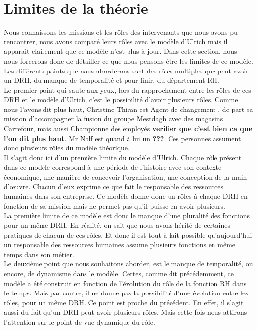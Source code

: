 \section{Limites de la théorie}

Nous connaissons les missions et les rôles des intervenants que nous avons pu rencontrer, nous avons comparé leurs rôles avec le modèle d'Ulrich mais il apparait clairement que ce modèle n'est plus à jour. Dans cette section, nous nous forcerons donc de détailler ce que nous pensons être les limites de ce modèle. Les différents points que nous aborderons sont des rôles multiples que peut avoir un DRH, du manque de temporalité et pour finir, du département RH. \\



Le premier point qui saute aux yeux, lors du rapprochement entre les rôles de ces DRH et le modèle d'Ulrich, c'est le possibilité d'avoir plusieurs rôles. Comme nous l'avons dit plus haut, Christine Thiran est \og Agent de changement \fg{}, de part sa mission d'accompagner la fusion du groupe Mestdagh avec des magasins Carrefour, mais aussi \og Championne des employés \fg{} \textbf{verifier que c'est bien ca que l'on dit plus haut}. Mr Nolf est quand à lui un \textbf{???}. Ces personnes assument donc plusieurs rôles du modèle théorique. \\

Il s'agit donc ici d'un première limite du modèle d'Ulrich. Chaque rôle présent dans ce modèle correspond à une période de l'histoire avec son contexte économique, une manière de concevoir l'organisation, une conception de la main d'œuvre. Chacun d'eux exprime ce que fait le responsable des ressources humaines dans son entreprise. Ce modèle donne donc un rôles à chaque DRH en fonction de sa mission mais ne permet pas qu'il puisse en avoir plusieurs. \\

La première limite de ce modèle est donc le manque d'une pluralité des fonctions pour un même DRH. En réalité, on sait que nous avons hérité de certaines pratiques de chacun de ces rôles. Et donc il est tout à fait possible qu'aujourd'hui un responsable des ressources humaines assume plusieurs fonctions en même temps dans son métier. \\



Le deuxième point que nous souhaitons aborder, est le manque de temporalité, ou encore, de dynamisme dans le modèle. Certes, comme dit précédemment, ce modèle a été construit en fonction de l'évolution du rôle de la fonction RH dans le temps. Mais  par contre, il ne donne pas la possibilité d'une évolution entre les rôles, pour un même DRH. Ce point est proche du précédent. En effet, il s'agit aussi du fait qu'un DRH peut avoir plusieurs rôles. Mais cette fois nous attirons l'attention sur le point de vue dynamique du rôle. \\

